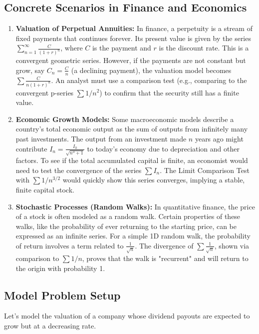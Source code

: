 \documentclass{article}
\begin{document}
\subsection{Concrete Scenarios in Finance and Economics}
\begin{enumerate}
    \item \textbf{Valuation of Perpetual Annuities:} In finance, a perpetuity is a stream of fixed payments that continues forever. Its present value is given by the series \(\sum_{n=1}^{\infty} \frac{C}{(1+r)^n}\), where \(C\) is the payment and \(r\) is the discount rate. This is a convergent geometric series. However, if the payments are not constant but grow, say \(C_n = \frac{C}{n}\) (a declining payment), the valuation model becomes \(\sum \frac{C}{n(1+r)^n}\). An analyst must use a comparison test (e.g., comparing to the convergent p-series \(\sum 1/n^2\)) to confirm that the security still has a finite value.
    \item \textbf{Economic Growth Models:} Some macroeconomic models describe a country's total economic output as the sum of outputs from infinitely many past investments. The output from an investment made \(n\) years ago might contribute \(I_n = \frac{I_0}{\sqrt{n^3+1}}\) to today's economy due to depreciation and other factors. To see if the total accumulated capital is finite, an economist would need to test the convergence of the series \(\sum I_n\). The Limit Comparison Test with \(\sum 1/n^{3/2}\) would quickly show this series converges, implying a stable, finite capital stock.
    \item \textbf{Stochastic Processes (Random Walks):} In quantitative finance, the price of a stock is often modeled as a random walk. Certain properties of these walks, like the probability of ever returning to the starting price, can be expressed as an infinite series. For a simple 1D random walk, the probability of return involves a term related to \(\frac{1}{\sqrt{n}}\). The divergence of \(\sum \frac{1}{\sqrt{n}}\), shown via comparison to \(\sum 1/n\), proves that the walk is "recurrent" and will return to the origin with probability 1.
\end{enumerate}

\subsection{Model Problem Setup}
Let's model the valuation of a company whose dividend payouts are expected to grow but at a decreasing rate.
\end{document}
